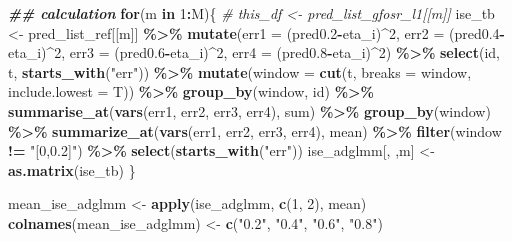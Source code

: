 \documentclass[
]{article}
\newenvironment{Shaded}{\begin{snugshade}}{\end{snugshade}}
\newcommand{\AttributeTok}[1]{\textcolor[rgb]{0.13,0.29,0.53}{#1}}
\newcommand{\CommentTok}[1]{\textcolor[rgb]{0.56,0.35,0.01}{\textit{#1}}}
\newcommand{\ControlFlowTok}[1]{\textcolor[rgb]{0.13,0.29,0.53}{\textbf{#1}}}
\newcommand{\DecValTok}[1]{\textcolor[rgb]{0.00,0.00,0.81}{#1}}
\newcommand{\DocumentationTok}[1]{\textcolor[rgb]{0.56,0.35,0.01}{\textbf{\textit{#1}}}}
\newcommand{\FloatTok}[1]{\textcolor[rgb]{0.00,0.00,0.81}{#1}}
\newcommand{\FunctionTok}[1]{\textcolor[rgb]{0.13,0.29,0.53}{\textbf{#1}}}
\newcommand{\NormalTok}[1]{#1}
\newcommand{\OtherTok}[1]{\textcolor[rgb]{0.56,0.35,0.01}{#1}}
\newcommand{\SpecialCharTok}[1]{\textcolor[rgb]{0.81,0.36,0.00}{\textbf{#1}}}
\newcommand{\StringTok}[1]{\textcolor[rgb]{0.31,0.60,0.02}{#1}}
\begin{document}
\begin{Shaded}
\begin{Highlighting}[]
\DocumentationTok{\#\# calculation}
\ControlFlowTok{for}\NormalTok{(m }\ControlFlowTok{in} \DecValTok{1}\SpecialCharTok{:}\NormalTok{M)\{}
  \CommentTok{\# this\_df \textless{}{-} pred\_list\_gfosr\_l1[[m]]}
\NormalTok{  ise\_tb }\OtherTok{\textless{}{-}}\NormalTok{ pred\_list\_ref[[m]] }\SpecialCharTok{\%\textgreater{}\%}
    \FunctionTok{mutate}\NormalTok{(}\AttributeTok{err1 =}\NormalTok{ (pred0}\FloatTok{.2}\SpecialCharTok{{-}}\NormalTok{eta\_i)}\SpecialCharTok{\^{}}\DecValTok{2}\NormalTok{,}
           \AttributeTok{err2 =}\NormalTok{ (pred0}\FloatTok{.4}\SpecialCharTok{{-}}\NormalTok{eta\_i)}\SpecialCharTok{\^{}}\DecValTok{2}\NormalTok{,}
           \AttributeTok{err3 =}\NormalTok{ (pred0}\FloatTok{.6}\SpecialCharTok{{-}}\NormalTok{eta\_i)}\SpecialCharTok{\^{}}\DecValTok{2}\NormalTok{,}
           \AttributeTok{err4 =}\NormalTok{ (pred0}\FloatTok{.8}\SpecialCharTok{{-}}\NormalTok{eta\_i)}\SpecialCharTok{\^{}}\DecValTok{2}\NormalTok{) }\SpecialCharTok{\%\textgreater{}\%}
    \FunctionTok{select}\NormalTok{(id, t, }\FunctionTok{starts\_with}\NormalTok{(}\StringTok{"err"}\NormalTok{)) }\SpecialCharTok{\%\textgreater{}\%} 
    \FunctionTok{mutate}\NormalTok{(}\AttributeTok{window =} \FunctionTok{cut}\NormalTok{(t, }\AttributeTok{breaks =}\NormalTok{ window, }\AttributeTok{include.lowest =}\NormalTok{ T)) }\SpecialCharTok{\%\textgreater{}\%} 
    \FunctionTok{group\_by}\NormalTok{(window, id) }\SpecialCharTok{\%\textgreater{}\%} 
    \FunctionTok{summarise\_at}\NormalTok{(}\FunctionTok{vars}\NormalTok{(err1, err2, err3, err4), sum) }\SpecialCharTok{\%\textgreater{}\%} 
    \FunctionTok{group\_by}\NormalTok{(window) }\SpecialCharTok{\%\textgreater{}\%} 
    \FunctionTok{summarize\_at}\NormalTok{(}\FunctionTok{vars}\NormalTok{(err1, err2, err3, err4), mean) }\SpecialCharTok{\%\textgreater{}\%}
    \FunctionTok{filter}\NormalTok{(window }\SpecialCharTok{!=} \StringTok{"[0,0.2]"}\NormalTok{) }\SpecialCharTok{\%\textgreater{}\%} 
    \FunctionTok{select}\NormalTok{(}\FunctionTok{starts\_with}\NormalTok{(}\StringTok{"err"}\NormalTok{))}
\NormalTok{  ise\_adglmm[, ,m] }\OtherTok{\textless{}{-}} \FunctionTok{as.matrix}\NormalTok{(ise\_tb)}
\NormalTok{\}}

\NormalTok{mean\_ise\_adglmm }\OtherTok{\textless{}{-}} \FunctionTok{apply}\NormalTok{(ise\_adglmm, }\FunctionTok{c}\NormalTok{(}\DecValTok{1}\NormalTok{, }\DecValTok{2}\NormalTok{), mean)}
\FunctionTok{colnames}\NormalTok{(mean\_ise\_adglmm) }\OtherTok{\textless{}{-}} \FunctionTok{c}\NormalTok{(}\StringTok{"0.2"}\NormalTok{, }\StringTok{"0.4"}\NormalTok{, }\StringTok{"0.6"}\NormalTok{, }\StringTok{"0.8"}\NormalTok{)}
\end{Highlighting}
\end{Shaded}
\end{document}
